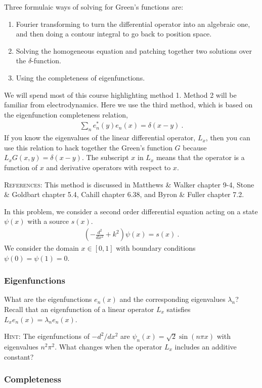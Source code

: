 \documentclass[12pt]{article}
\numberwithin{equation}{subsection}    %
\begin{document}
Three formulaic ways of solving for Green's functions are:
\begin{enumerate}
	\item Fourier transforming to turn the differential operator into an algebraic one, and then doing a contour integral to go back to position space.
	\item Solving the homogeneous equation and patching together two solutions over the $\delta$-function. 
	\item Using the completeness of eigenfunctions.
\end{enumerate}
We will spend most of this course highlighting method 1. Method 2 will be familiar from electrodynamics. Here we use the third method, which is based on the eigenfunction completeness relation,
\begin{align}
	\sum_n e_n^*(y) e_n(x) = \delta(x-y) \ .
\end{align}
If you know the eigenvalues of the linear differential operator, $L_x$, then you can use this relation to hack together the Green's function $G$ because $L_x G(x,y) = \delta(x-y)$.  The subscript $x$ in $L_x$ means that the operator is a function of $x$ and derivative operators with respect to $x$.

\textsc{References}: This method is discussed in  Matthews \& Walker chapter 9-4, Stone \& Goldbart chapter 5.4, Cahill chapter 6.38, and Byron \& Fuller chapter 7.2. 

In this problem, we consider a second order differential equation acting on a state $\psi(x)$ with a source $s(x)$. 
\begin{align*}
	\left(-\frac{d^2}{dx^2} + k^2 \right) \psi(x) = s(x) \ .
\end{align*}
We consider the domain $x\in[0,1]$ with boundary conditions $\psi(0) = \psi(1) = 0$.

\subsubsection{Eigenfunctions}

What are the eigenfunctions $e_n(x)$ and the corresponding eigenvalues $\lambda_n$? Recall that an eigenfunction of a linear operator $L_x$ satisfies $L_x e_n(x) = \lambda_n e_n(x)$. 


\textsc{Hint:} The eigenfunctions of $-d^2/dx^2$ are $\psi_n(x) = \sqrt{2} \sin (n\pi x)$ with eigenvalues $n^2 \pi^2$. What changes when the operator $L_x$ includes an additive constant?


\subsubsection{Completeness}
\end{document}
